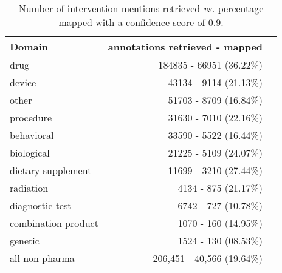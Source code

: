 \documentclass[letterpaper]{article} %
\begin{document}
%
\begin{table}[!htbp]
\centering
\begin{tabular}{lrl}
\hline \textbf{Domain} & \textbf{ annotations retrieved - mapped } \\ \hline
drug & 184835 - 66951 (36.22\%) \\
device & 43134 - 9114 (21.13\%) \\
other & 51703 - 8709 (16.84\%) \\
procedure & 31630 - 7010 (22.16\%) \\
behavioral & 33590 - 5522 (16.44\%) \\
biological & 21225 - 5109 (24.07\%) \\
dietary supplement & 11699 - 3210 (27.44\%) \\
radiation & 4134 - 875 (21.17\%) \\
diagnostic test & 6742 - 727 (10.78\%) \\
combination product & 1070 - 160 (14.95\%) \\
genetic & 1524 - 130 (08.53\%) \\
all non-pharma & 206,451 - 40,566 (19.64\%)\\
\hline
\end{tabular}
\caption{Number of intervention mentions retrieved \textit{vs.} percentage mapped with a confidence score of 0.9.}
\label{table:int_type09} 
\end{table}
%
%
%
\end{document}
